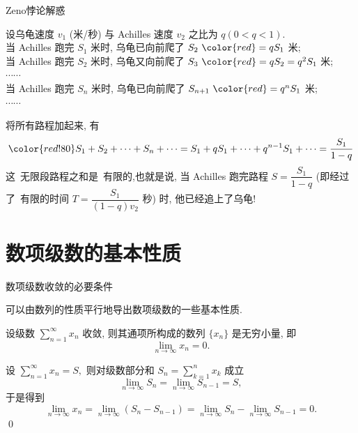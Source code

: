 
\begin{frame}{Zeno悖论解惑}

设乌龟速度 $v_1$ (米/秒) 与 Achilles 速度 $v_2$ 之比为 $q ( 0 < q < 1).$\\
当 Achilles 跑完 $S_1$ 米时, 乌龟已向前爬了 $S_2 ~ {\color{red} = qS_1}$ 米; \\
当 Achilles 跑完 $S_2$ 米时, 乌龟又向前爬了 $S_3 ~ {\color{red} = qS_2 = q^2S_1}$ 米; \\
$\cdots\cdots$\\
当 Achilles 跑完 $S_n$ 米时, 乌龟已向前爬了 $S_{n+1} ~ {\color{red} = q^nS_1}$ 米; \\
$\cdots\cdots$\\

\pause
\vspace*{0.5em}

将所有路程加起来, 有
\[\color{red!80} S_1 + S_2 + \cdots + S_n + \cdots = S_1 + qS_1 + \cdots + q^{n-1}S_1 + \cdots = \dfrac{S_1}{1 - q}\]
这~{\color{red}无限段}路程之和是~{\color{red}有限}的,也就是说, 当 Achilles 跑完路程 $S = \dfrac{S_1}{1 - q}$ (即经过了~{\color{red}有限}的时间 $T = \dfrac{S_1}{(1-q)v_2}$ 秒) 时, 他已经追上了乌龟!

\end{frame}


\section[基本性质]{数项级数的基本性质}


\begin{frame}{数项级数收敛的必要条件}

可以由数列的性质平行地导出数项级数的一些基本性质.

\pause

\begin{thm}[数项级数收敛的必要条件]
设级数 $\sum\limits_{n=1}^\infty x_n$ 收敛, 则其通项所构成的数列 $\{x_n\}$ 是无穷小量, 即
\[\lim\limits_{n\to\infty} x_n = 0.\]
\end{thm}

\pause

\startproof[bg=yellow, fg=red]
设 $\sum\limits_{n=1}^\infty x_n = S,$ 则对级数部分和 $S_n = \sum\limits_{k=1}^n x_k$ 成立
\[\lim\limits_{n\to\infty} S_n = \lim\limits_{n\to\infty} S_{n-1} = S,\]
于是得到
\[\lim\limits_{n\to\infty} x_n = \lim\limits_{n\to\infty} (S_n - S_{n-1}) = \lim\limits_{n\to\infty} S_n - \lim\limits_{n\to\infty} S_{n-1} = 0.\]
\qed

\end{frame}

